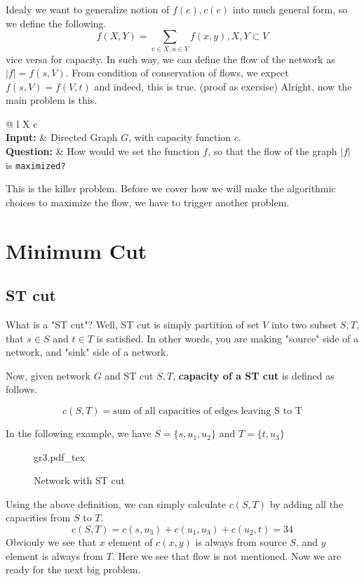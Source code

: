 \documentclass[12pt]{article}
\begin{document}
Idealy we want to generalize notion of $f(e),c(e)$ into much general form, so we define the following.
$$f(X,Y)=\sum_{v\in X, u\in Y}f(x,y), X,Y \subset V$$
vice versa for capacity.
In such way, we can define the flow of the network as $|f| = f(s,V)$. From condition of conservation of flows, we expect
$f(s,V) = f(V,t)$
 and indeed, this is true. (proof as exersise)
Alright, now the main problem is this.

\begin{tabularx}{\textwidth}{@{\hspace{\parindent}} l X c}
    \\%
   \textbf{Input:} & Directed Graph $G$, with capacity function $c$. \\%
   \textbf{Question:} & How would we set the function $f$, so that the flow of the graph $|f|$ is \texttt{maximized?} %
 \end{tabularx}

This is the killer problem. Before we cover how we will make the algorithmic choices to maximize the flow, we have to trigger another problem.

\section{Minimum Cut}

\subsection{ST cut}
What is a "ST cut"? Well, ST cut is simply partition of set $V$ into two subset $S, T$, that $s\in S$ and $t \in T$ is satisfied. In other words, you are making "source" side of a network, and "sink" side of a network.

Now, given network $G$ and ST cut $S,T$, \textbf{capacity of a ST cut} is defined as follows.

$$c(S,T) = \text{sum of all capacities of edges leaving S to T}$$

In the following example, we have $S = \{s, u_1, u_2 \}$ and $T=\{t, u_3\}$

\begin{figure}[H]
	\centering
	\def\svgwidth{\columnwidth}
	{gr3.pdf_tex}
	\caption{Network with ST cut}
	\label{fig:gr3}
\end{figure}

Using the above definition, we can simply calculate $c(S,T)$ by adding all the capacities from $S$ to $T$.
$$c(S,T) = c(s,u_3)+c(u_1,u_3)+c(u_2,t)=34$$
Obviouly we see that $x$ element of $c(x,y)$ is always from source $S$, and $y$ element is always from $T$. Here we see that flow is not mentioned. Now we are ready for the next big problem.
\end{document}
